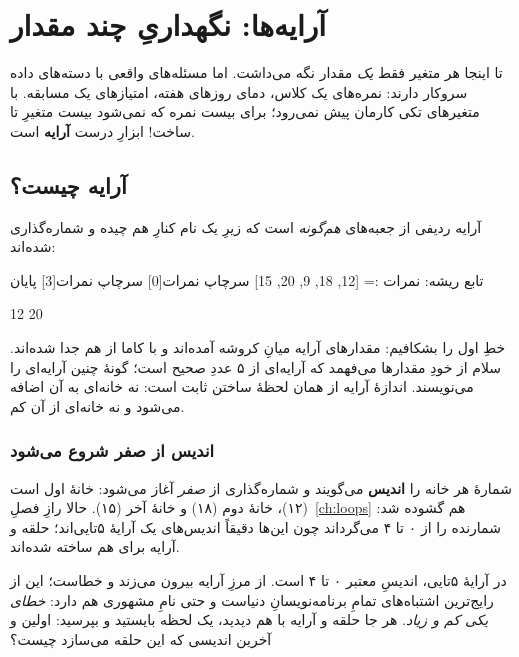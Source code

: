 \chapter{آرایه‌ها: نگهداریِ چند مقدار}%
\label{ch:arrays}

تا اینجا هر متغیر فقط \emph{یک} مقدار نگه می‌داشت. اما مسئله‌های واقعی با
دسته‌های داده سروکار دارند: نمره‌های یک کلاس، دمای روزهای هفته، امتیازهای
یک مسابقه. با متغیرهای تکی کارمان پیش نمی‌رود؛ برای بیست نمره که نمی‌شود
بیست متغیرِ  تا  ساخت! ابزارِ درست
\textbf{آرایه} است.

\section{آرایه چیست؟}

آرایه ردیفی از جعبه‌های \emph{هم‌گونه} است که زیرِ یک نام کنارِ هم چیده و
شماره‌گذاری شده‌اند:

\begin{salamfa}
تابع ریشه:
    نمرات := [12, 18, 9, 20, 15]
    سرچاپ نمرات[0]
    سرچاپ نمرات[3]
پایان
\end{salamfa}

\begin{progout}
12
20
\end{progout}

خطِ اول را بشکافیم: مقدارهای آرایه میانِ کروشه آمده‌اند و با کاما از هم جدا
شده‌اند. سلام از خودِ مقدارها می‌فهمد که  آرایه‌ای از ۵ عددِ
صحیح است؛ گونهٔ چنین آرایه‌ای را  می‌نویسند. اندازهٔ آرایه
از همان لحظهٔ ساختن ثابت است: نه خانه‌ای به آن اضافه می‌شود و نه خانه‌ای
از آن کم.

\subsection{اندیس از صفر شروع می‌شود}

شمارهٔ هر خانه را \textbf{اندیس} می‌گویند و شماره‌گذاری از \emph{صفر} آغاز
می‌شود:  خانهٔ اول است (۱۲)،  خانهٔ دوم
(۱۸) و  خانهٔ آخر (۱۵). حالا رازِ فصلِ~\ref{ch:loops} هم
گشوده شد:  شمارنده را از ۰ تا ۴ می‌گرداند چون این‌ها
دقیقاً اندیس‌های یک آرایهٔ ۵تایی‌اند؛ حلقه و آرایه برای هم ساخته شده‌اند.

\begin{warn}
در آرایهٔ ۵تایی، اندیسِ معتبر ۰ تا ۴ است.  از مرزِ آرایه
بیرون می‌زند و خطاست؛ این از رایج‌ترین اشتباه‌های تمامِ برنامه‌نویسانِ
دنیاست و حتی نامِ مشهوری هم دارد: \emph{خطای یکی کم و زیاد}. هر جا حلقه و
آرایه با هم دیدید، یک لحظه بایستید و بپرسید: اولین و آخرین اندیسی که این
حلقه می‌سازد چیست؟
\end{warn}

